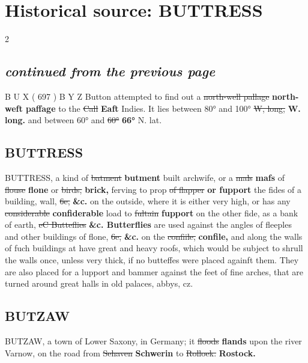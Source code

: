 \documentclass[10pt]{article}
\begin{document}
\section*{Historical source: BUTTRESS}
\begin{multicols}{2}
\subsection*{\textit{continued from the previous page}}
B U X ( 697 ) B Y Z Button attempted to find out a \sout{north-well pallage} \textbf{north-weft paffage} to the \sout{Call} \textbf{Eaft} Indies. It lies between 80° and 100° \sout{W, long,} \textbf{W. long.} and between 60° and \sout{60°} \textbf{66°} N. lat.

\subsection*{BUTTRESS}
BUTTRESS, a kind of \sout{batment} \textbf{butment} built archwife, or a \sout{mals} \textbf{mafs} of \sout{flouse} \textbf{flone} or \sout{birds,} \textbf{brick,} ferving to prop \sout{of flapper} \textbf{or fupport} the fides of a building, wall, \sout{6e,} \textbf{\&c.} on the outside, where it is either very high, or has any \sout{considerable} \textbf{confiderable} load to \sout{fultain} \textbf{fupport} on the other fide, as a bank of earth, \sout{eC Butteflies} \textbf{\&c. Butterflies} are used against the angles of fleeples and other buildings of flone, \sout{6e,} \textbf{\&c.} on the \sout{confiile,} \textbf{confile,} and along the walls of fuch buildings at have great and heavy roofs, which would be subject to shrull the walls once, unless very thick, if no butteffes were placed againft them. They are also placed for a lupport and bammer against the feet of fine arches, that are turned around great halls in old palaces, abbys, cz.

\subsection*{BUTZAW}
BUTZAW, a town of Lower Saxony, in Germany; it \sout{floods} \textbf{flands} upon the river Varnow, on the road from \sout{Sehaven} \textbf{Schwerin} to \sout{Rolloek.} \textbf{Rostock.}


\end{multicols}
\end{document}

